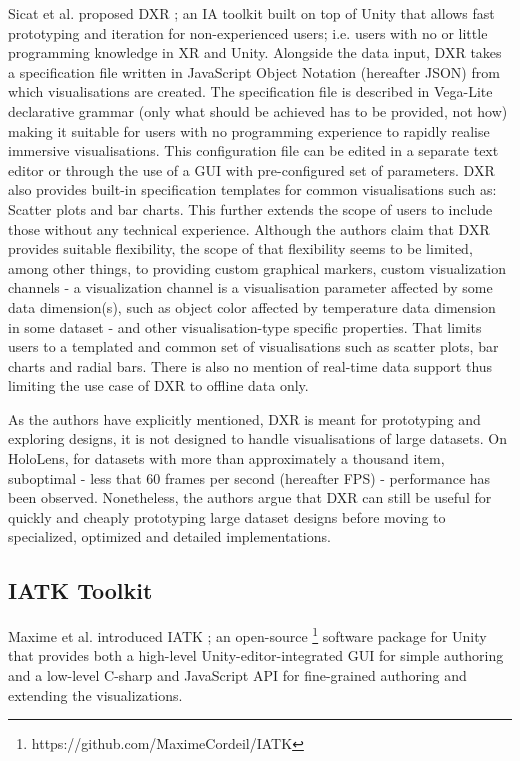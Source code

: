 \documentclass{vgtc}                          %
\begin{document}
Sicat et al. proposed DXR \cite{dxr_toolkit}; an IA toolkit built on top of Unity
that allows fast prototyping and iteration for non-experienced users; i.e.
users with no or little programming knowledge in XR and Unity.
Alongside the data input, DXR takes a specification file written in JavaScript
Object Notation (hereafter JSON) from which visualisations are created.
The specification file is described in Vega-Lite declarative grammar \cite{vega_lite}
(only what should be achieved has to be provided, not how) making it suitable
for users with no programming experience to rapidly realise immersive
visualisations. This configuration file can be edited in a separate text editor or through
the use of a GUI with pre-configured set of parameters. DXR also provides
built-in specification templates for common visualisations such as: Scatter
plots and bar charts. This further extends the scope of users to include
those without any technical experience. Although the authors claim that DXR
provides suitable flexibility, the scope of that flexibility seems to be
limited, among other things, to providing custom graphical markers, custom
visualization channels - a visualization channel is a visualisation parameter affected by some
data dimension(s), such as object color affected by temperature data dimension in some dataset -
and other visualisation-type specific properties. That limits users to a
templated and common set of visualisations such as scatter plots, bar charts
and radial bars. There is also no mention of real-time data support thus
limiting the use case of DXR to offline data only.

\smallskip

\noindent As the authors have explicitly mentioned, DXR is meant for
prototyping and exploring designs, it is not designed to handle visualisations
of large datasets. On HoloLens, for datasets with more than approximately
a thousand item, suboptimal - less that 60 frames per second (hereafter FPS) -
performance has been observed. Nonetheless, the authors argue that DXR can still
be useful for quickly and cheaply prototyping large dataset designs before
moving to specialized, optimized and detailed implementations.

\subsection{IATK Toolkit}
Maxime et al. introduced IATK \cite{iatk_toolkit}; an open-source
\footnote{https://github.com/MaximeCordeil/IATK} software
package for Unity that provides both a high-level Unity-editor-integrated GUI
for simple authoring and a low-level C-sharp and JavaScript API for
fine-grained authoring and extending the visualizations.
\end{document}
